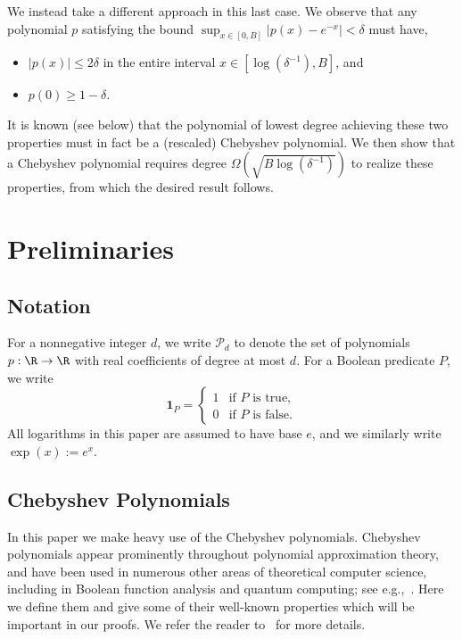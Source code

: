     We instead take a different approach in this last case. We observe that any polynomial $p$ satisfying the bound $\sup_{x \in [0, B]} \big| p(x) - e^{-x} \big| < \delta$ must have,
    \begin{itemize}
        \item $|p(x)| \leq 2\delta$ in the entire interval $x \in [\log(\delta^{-1}), B]$, and
        \item $p(0) \geq 1-\delta$.
    \end{itemize}
    It is known (see  below) that the polynomial of lowest degree achieving these two properties must in fact be a (rescaled) Chebyshev polynomial. We then show that a Chebyshev polynomial requires degree $\Omega(\sqrt{B \log (\delta^{-1})})$ to realize these properties, from which the desired result follows.
    
    
    
    
    
\section{Preliminaries} \label{sec:prelims}

\subsection{Notation}

For a nonnegative integer $d$, we write $\mathcal{P}_d$ to denote the set of polynomials $p : \R \to \R$ with real coefficients of degree at most $d$.
For a Boolean predicate $P$, we write $$\textbf{1}_{P} = \begin{cases} 1 &\mbox{if } P \mbox{ is true,} \\
0 &\mbox{if } P \mbox{ is false.} \end{cases}$$ 
All logarithms in this paper are assumed to have base $e$, and we similarly write $\exp(x) := e^x$.

\subsection{Chebyshev Polynomials}

In this paper we make heavy use of the Chebyshev polynomials. Chebyshev polynomials appear prominently throughout polynomial approximation theory, and have been used in numerous other areas of theoretical computer science, including in Boolean function analysis and quantum computing; see e.g.,~\cite{bun2021guest}. Here we define them and give some of their well-known properties which will be important in our proofs. We refer the reader to~\cite{P} for more details.

